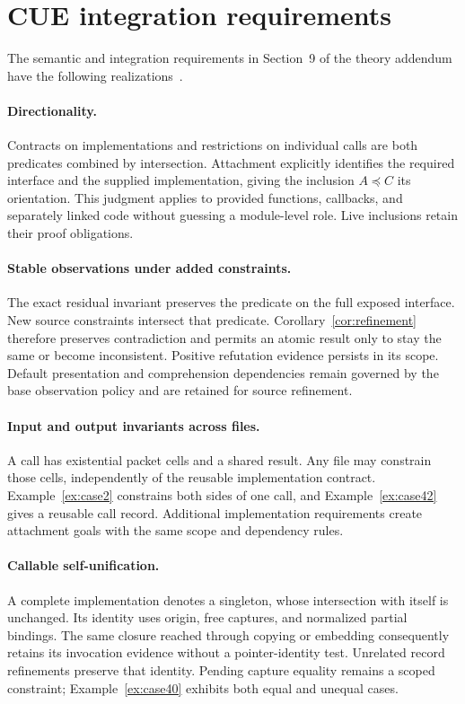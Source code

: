 \documentclass[10pt,a4paper]{article}
\theoremstyle{remark}
\begin{document}
\appendix
{}
\section{CUE integration requirements}
\label{app:criteria}
The semantic and integration requirements in Section~9 of the theory addendum
have the following realizations~\cite{cueaddendum}.

\paragraph{Directionality.}
Contracts on implementations and restrictions on individual calls are both
predicates combined by intersection. Attachment explicitly identifies the
required interface and the supplied implementation, giving the inclusion
$A\preceq C$ its orientation. This judgment applies to provided functions,
callbacks, and separately linked code without guessing a module-level role.
Live inclusions retain their proof obligations.

\paragraph{Stable observations under added constraints.}
The exact residual invariant preserves the predicate on the full exposed
interface. New source constraints intersect that predicate. Corollary~\ref{cor:refinement}
therefore preserves contradiction and permits an atomic result only to stay the
same or become inconsistent. Positive refutation evidence persists in its scope.
Default presentation and comprehension dependencies remain governed by the base
observation policy and are retained for source refinement.

\paragraph{Input and output invariants across files.}
A call has existential packet cells and a shared result. Any file may constrain
those cells, independently of the reusable implementation contract.
Example~\ref{ex:case2} constrains both sides of one call, and
Example~\ref{ex:case42} gives a reusable call record. Additional implementation
requirements create attachment goals with the same scope and dependency rules.

\paragraph{Callable self-unification.}
A complete implementation denotes a singleton, whose intersection with itself
is unchanged. Its identity uses origin, free captures, and normalized partial
bindings. The same closure reached through copying or embedding consequently
retains its invocation evidence without a pointer-identity test. Unrelated
record refinements preserve that identity. Pending capture equality remains a
scoped constraint; Example~\ref{ex:case40} exhibits both equal and unequal cases.
\end{document}
